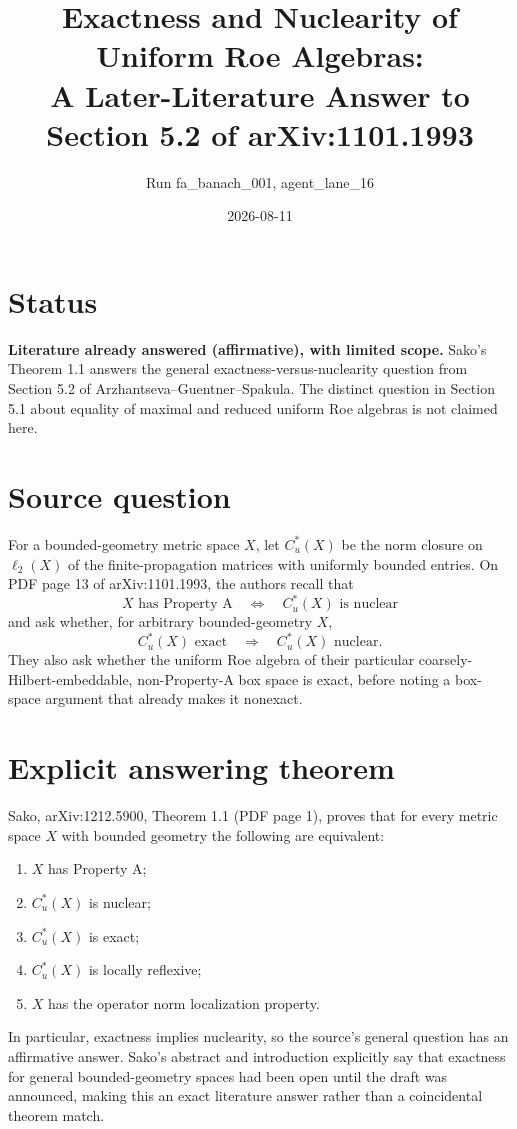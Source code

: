 \documentclass[11pt]{article}
\title{Exactness and Nuclearity of Uniform Roe Algebras:\\
A Later-Literature Answer to Section 5.2 of arXiv:1101.1993}
\author{Run fa\_banach\_001, agent\_lane\_16}
\date{2026-08-11}
\begin{document}
\maketitle

\section*{Status}

\textbf{Literature already answered (affirmative), with limited scope.}
Sako's Theorem 1.1 answers the general exactness-versus-nuclearity question
from Section 5.2 of Arzhantseva--Guentner--Spakula.  The distinct question in
Section 5.1 about equality of maximal and reduced uniform Roe algebras is not
claimed here.

\section*{Source question}

For a bounded-geometry metric space $X$, let $C_u^*(X)$ be the norm closure on
$\ell_2(X)$ of the finite-propagation matrices with uniformly bounded entries.
On PDF page 13 of arXiv:1101.1993, the authors recall that
\[
 X\text{ has Property A}\quad\Longleftrightarrow\quad C_u^*(X)
 \text{ is nuclear}
\]
and ask whether, for arbitrary bounded-geometry $X$,
\[
 C_u^*(X)\text{ exact}\quad\Longrightarrow\quad C_u^*(X)\text{ nuclear}.
\]
They also ask whether the uniform Roe algebra of their particular
coarsely-Hilbert-embeddable, non-Property-A box space is exact, before noting a
box-space argument that already makes it nonexact.

\section*{Explicit answering theorem}

Sako, arXiv:1212.5900, Theorem 1.1 (PDF page 1), proves that for every metric
space $X$ with bounded geometry the following are equivalent:
\begin{enumerate}
  \item $X$ has Property A;
  \item $C_u^*(X)$ is nuclear;
  \item $C_u^*(X)$ is exact;
  \item $C_u^*(X)$ is locally reflexive;
  \item $X$ has the operator norm localization property.
\end{enumerate}
In particular, exactness implies nuclearity, so the source's general question
has an affirmative answer.  Sako's abstract and introduction explicitly say
that exactness for general bounded-geometry spaces had been open until the
draft was announced, making this an exact literature answer rather than a
coincidental theorem match.
\end{document}
